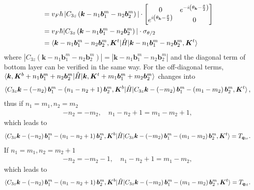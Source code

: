\documentclass[10pt, oneside]{article}
\newcommand{\te}{\theta}
\newcommand{\p}[1]{\left(#1\right)}
\begin{document}
\begin{align}
\begin{split}
		& = v_{F} \hbar \, |C_{3z} \p{\bm{k} - n_{1} \bm{b}^{m}_{1} - n_{2} \bm{b}^{m}_{2}} | \cdot \begin{bmatrix}
			0 & e^{-i \p{\te_{\bm{k}} - \frac{\te}{2}}} \\
			e^{i \p{\te_{\bm{k}} - \frac{\te}{2}}} & 0
		\end{bmatrix} \\
		& = v_{F} \hbar |C_{3z} \p{\bm{k} - n_{1} \bm{b}^{m}_{1} - n_{2} \bm{b}^{m}_{2}} | \cdot \sigma_{\te/2} \\
		&=\braket{\bm{k} -n_{1} \bm{b}^{m}_{1} - n_{2} \bm{b}^{m}_{2}, \bm{K}^{t}|\hat{H}|\bm{k} -n_{1} \bm{b}^{m}_{1} - n_{2} \bm{b}^{m}_{2}, \bm{K}^{t}}
	\end{split}
\end{align}
where \(|C_{3z} \p{\bm{k} - n_{1} \bm{b}^{m}_{1} - n_{2} \bm{b}^{m}_{2}} | = |\bm{k} - n_{1} \bm{b}^{m}_{1} - n_{2} \bm{b}^{m}_{2}|\) and the diagonal term of bottom layer can be verified in the same way. 
For the off-diagonal terms, \(\braket{\bm{k}, \bm{K}^{b} + n_{1} \bm{b}^{m}_{1} + n_{2} \bm{b}^{m}_{2}| \hat{H}|\bm{k}, \bm{K}^{t} + m_{1} \bm{b}^{m}_{1} + m_{2} \bm{b}^{m}_{2} }\) changes into
\begin{align}
	\braket{C_{3 z} \bm{k} - \p{-n_{2}} \bm{b}^{m}_{1} - \p{n_{1} - n_{2} + 1} \bm{b}^{m}_{2}, \bm{K}^{b}|\hat{H} |C_{3 z} \bm{k} - \p{-m_{2}} \bm{b}^{m}_{1} - \p{m_{1} - m_{2}} \bm{b}^{m}_{2}, \bm{K}^{t} },
\end{align}
thus if \(n_{1} = m_{1}, n_{2} = m_{2}\)
\begin{align}
	- n_{2} = - m_{2},\quad n_{1} - n_{2} + 1 = m_{1} - m_{2} + 1,
\end{align}
which leads to 
\begin{align}
	\braket{C_{3 z} \bm{k} - \p{-n_{2}} \bm{b}^{m}_{1} - \p{n_{1} - n_{2} + 1} \bm{b}^{m}_{2}, \bm{K}^{b}|\hat{H} |C_{3 z} \bm{k} - \p{-m_{2}} \bm{b}^{m}_{1} - \p{m_{1} - m_{2}} \bm{b}^{m}_{2}, \bm{K}^{t} } = T_{\bm{q}_{tr}}.
\end{align}
If \(n_{1} = m_{1}, n_{2} = m_{2} + 1\) 
\begin{align}
	- n_{2} = -m_{2}  - 1 ,\quad n_{1} - n_{2} + 1 = m_{1} - m_{2},
\end{align}
which leads to
\begin{align}
	\braket{C_{3 z} \bm{k} - \p{-n_{2}} \bm{b}^{m}_{1} - \p{n_{1} - n_{2} + 1} \bm{b}^{m}_{2}, \bm{K}^{b}|\hat{H} |C_{3 z} \bm{k} - \p{-m_{2}} \bm{b}^{m}_{1} - \p{m_{1} - m_{2}} \bm{b}^{m}_{2}, \bm{K}^{t} } = T_{\bm{q}_{tl}}.
\end{align}
\end{document}
